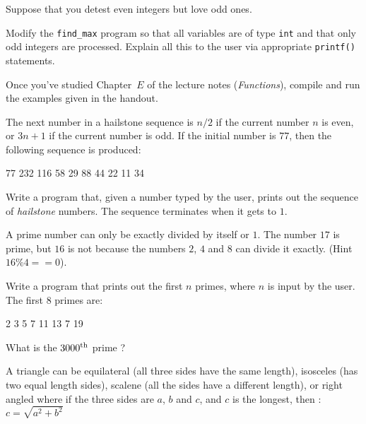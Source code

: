 Suppose that you detest even integers but love odd ones.

\begin{exercise}
Modify the \verb^find_max^ program so that all variables
are of type \verb^int^ and that only odd integers are processed.
Explain all this to the user via appropriate \verb^printf()^ statements.
\end{exercise}


\begin{exercise}
Once you've studied Chapter~$E$ of the lecture notes ({\em Functions}), compile and run
the examples given in the handout.
\end{exercise}

The next number in a hailstone sequence is $n/2$ if the current
number $n$ is even, or $3n+1$ if the current number is odd. If the
initial number is $77$, then the following sequence is produced:
\begin{terminaloutput}
77
232
116
58
29
88
44
22
11
34
\end{terminaloutput}

\begin{exercise}
Write a program that, given a number typed by the user,
prints out the sequence of {\em hailstone} numbers.
The sequence terminates when it gets to $1$.
\end{exercise}

A prime number can only be exactly divided by itself
or $1$. The number $17$ is prime, but $16$ is not because
the numbers $2$, $4$ and $8$ can divide it exactly.
(Hint~$16\%4 == 0$).
\begin{exercise}
Write a program that prints out the first $n$ primes, where
$n$ is input by the user. The first $8$ primes are:
\begin{terminaloutput}
2
3
5
7
11
13
7
19
\end{terminaloutput}
What is the $3000^{\rm th}$ prime ?
\end{exercise}


A triangle can be equilateral (all three sides have the same length),
isosceles (has two equal length sides), scalene
(all the sides have a different length), or 
right angled where if the three sides are $a$, $b$ and $c$,
and $c$ is the longest, then :
\begin{math}
c = \sqrt{a^2 + b^2}
\end{math}

